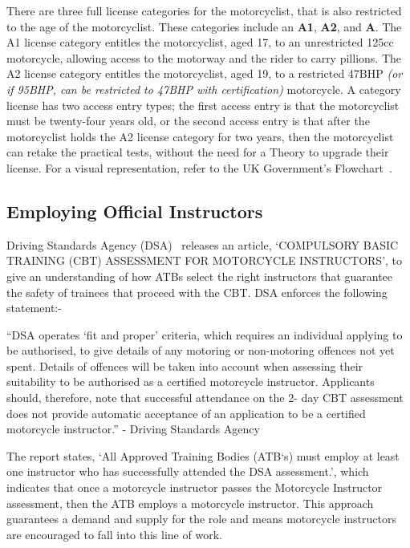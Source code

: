 \documentclass[12pt]{report} %
\begin{document}
			There are three full license categories for the motorcyclist, that is also restricted to the age of the motorcyclist. These categories include an \textbf{A1}, \textbf{A2}, and \textbf{A}. The A1 license category entitles the motorcyclist, aged 17, to an unrestricted 125cc motorcycle, allowing access to the motorway and the rider to carry pillions. The A2 license category entitles the motorcyclist, aged 19, to a restricted 47BHP \textit{(or if 95BHP, can be restricted to 47BHP with certification)} motorcycle. A category license has two access entry types; the first access entry is that the motorcyclist must be twenty-four years old, or the second access entry is that after the motorcyclist holds the A2 license category for two years, then the motorcyclist can retake the practical tests, without the need for a Theory to upgrade their license. For a visual representation, refer to the UK Government's Flowchart~\cite{govuk_motorcycle_nodate}.

		\subsection*{Employing Official Instructors}
			Driving Standards Agency (DSA)~\cite{driving_standards_agency_compulsory_nodate} releases an article, `COMPULSORY BASIC TRAINING (CBT) ASSESSMENT FOR MOTORCYCLE INSTRUCTORS', to give an understanding of how ATBs select the right instructors that guarantee the safety of trainees that proceed with the CBT. DSA enforces the following statement:-
            \begin{center}
                ``DSA operates `fit and proper' criteria, which requires an individual applying to be authorised,
                to give details of any motoring or non-motoring offences not yet spent. Details of offences will
                be taken into account when assessing their suitability to be authorised as a certified
                motorcycle instructor. Applicants should, therefore, note that successful attendance on the 2-
                day CBT assessment does not provide automatic acceptance of an application to be a
                certified motorcycle instructor.'' - Driving Standards Agency~\cite{driving_standards_agency_compulsory_nodate}
            \end{center}
            
            The report states, `All Approved Training Bodies (ATB`s) must employ at least one instructor who has successfully attended the DSA assessment.', which indicates that once a motorcycle instructor passes the Motorcycle Instructor assessment, then the ATB employs a motorcycle instructor. This approach guarantees a demand and supply for the role and means motorcycle instructors are encouraged to fall into this line of work.
            
\end{document}
